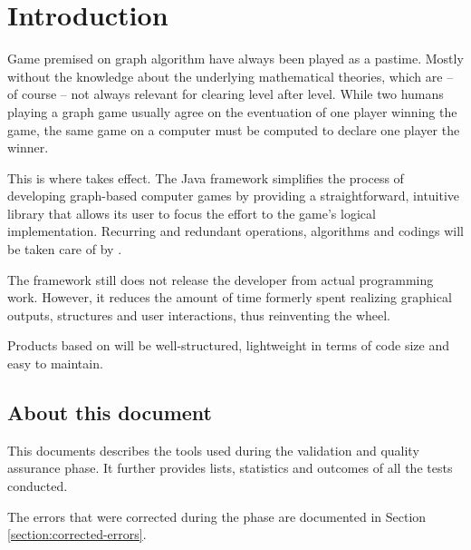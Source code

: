 \section{Introduction}
Game premised on graph algorithm have always been played as a pastime. Mostly without the knowledge about the underlying mathematical theories, which are -- of course -- not always relevant for clearing level after level. While two humans playing a graph game usually agree on the eventuation of one player winning the game, the same game on a computer must be computed to declare one player the winner.\par

This is where \graphioli takes effect. The Java framework simplifies the process of developing graph-based computer games by providing a straightforward, intuitive library that allows its user to focus the effort to the game's logical implementation. Recurring and redundant operations, algorithms and codings will be taken care of by \graphioli.\par

The framework still does not release the developer from actual programming work. However, it reduces the amount of time formerly spent realizing graphical outputs, structures and user interactions, thus reinventing the wheel.\par

Products based on \graphioli will be well-structured, lightweight in terms of code size and easy to maintain.\par

\subsection{About this document}
This documents describes the tools used during the validation and quality assurance phase. It further provides lists, statistics and outcomes of all the tests conducted.\par
{}
The errors that were corrected during the phase are documented in Section \ref{section:corrected-errors}.\par
